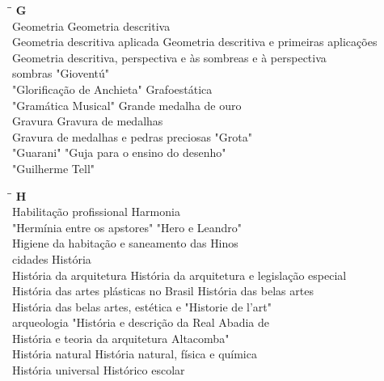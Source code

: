 \begin{tabbing}
	\hspace{8,7cm}\=\hspace{1cm}\=\kill
	\textbf{G} \>  \\ 
	Geometria	\> Geometria descritiva\\
	Geometria descritiva aplicada \> Geometria descritiva e primeiras aplicações\\
	Geometria descritiva, perspectiva e \> às sombreas e à perspectiva\\
	sombras \> "Gioventú"\\ 
	"Glorificação de Anchieta" \>  Grafoestática\\ 
	"Gramática Musical" \> Grande medalha de ouro\\ 
	Gravura \> Gravura de medalhas\\
	Gravura de medalhas e pedras preciosas \> "Grota" \\
	"Guarani" \> "Guja para o ensino do desenho"\\ 
	"Guilherme Tell" \> \\			   	   
\end{tabbing}

\begin{tabbing}
	\hspace{8,7cm}\=\hspace{1cm}\=\kill
	\textbf{H} \>  \\ 
	Habilitação profissional	\> Harmonia\\
	"Hermínia entre os apstores" \> "Hero e Leandro"\\
	Higiene da habitação e saneamento das\> Hinos\\
	cidades \> História\\ 
	História da arquitetura \>  História da arquitetura e legislação especial\\ 
	História das artes plásticas no Brasil \> História das belas artes\\ 
	História das belas artes, estética e \> "Historie de l'art"\\
	arqueologia \> "História e descrição da Real Abadia de \\
	História e teoria da arquitetura \> Altacomba"\\ 
	História natural \> História natural, física e química\\
	História universal \> Histórico escolar\\			   	   
\end{tabbing}

